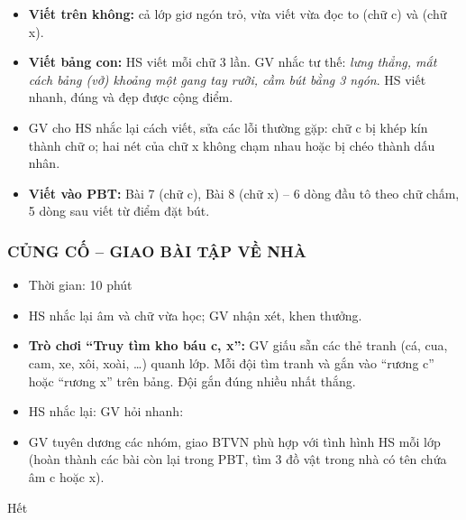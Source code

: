 \documentclass[../main.tex]{subfiles}
\begin{document}
\begin{itemize}
    \item \textbf{Viết trên không:} cả lớp giơ ngón trỏ, vừa viết vừa đọc to  (chữ c) và  (chữ x).
    \item \textbf{Viết bảng con:} HS viết mỗi chữ 3 lần. GV nhắc tư thế: \textit{lưng thẳng, mắt cách bảng (vở) khoảng một gang tay rưỡi, cầm bút bằng 3 ngón}. HS viết nhanh, đúng và đẹp được cộng điểm.
    \item GV cho HS nhắc lại cách viết, sửa các lỗi thường gặp: chữ c bị khép kín thành chữ o; hai nét của chữ x không chạm nhau hoặc bị chéo thành dấu nhân.
    \item \textbf{Viết vào PBT:} Bài 7 (chữ c), Bài 8 (chữ x) -- 6 dòng đầu tô theo chữ chấm, 5 dòng sau viết từ điểm đặt bút.
\end{itemize}

\subsubsection{CỦNG CỐ -- GIAO BÀI TẬP VỀ NHÀ}
\begin{hd}
    \begin{itemize}
        \item Thời gian: 10 phút
        \item HS nhắc lại âm và chữ vừa học; GV nhận xét, khen thưởng.
    \end{itemize}
\end{hd}
\begin{itemize}
    \item \textbf{Trò chơi “Truy tìm kho báu c, x”:} GV giấu sẵn các thẻ tranh (cá, cua, cam, xe, xôi, xoài, \dots) quanh lớp. Mỗi đội tìm tranh và gắn vào “rương c” hoặc “rương x” trên bảng. Đội gắn đúng nhiều nhất thắng.
    \item HS nhắc lại:  GV hỏi nhanh: 
    \item GV tuyên dương các nhóm, giao BTVN phù hợp với tình hình HS mỗi lớp (hoàn thành các bài còn lại trong PBT, tìm 3 đồ vật trong nhà có tên chứa âm c hoặc x).
\end{itemize}

\begin{center}
       \faGg\faGg\quad Hết \quad\faGg\faGg
\end{center}
\end{document}

